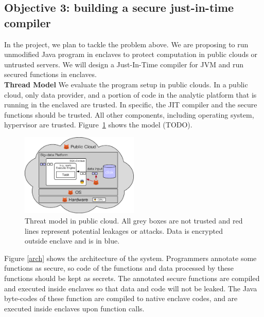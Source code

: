 \vspace{-.15in}\subsection{Objective 3: building a 
secure just-in-time compiler}\label{sec:obj3}\vspace{-.075in}


In the project, we plan to tackle the problem above. We are proposing to
run unmodified Java program in enclaves to protect computation in public
clouds or untrusted servers. We will design a Just-In-Time compiler for JVM
and run secured functions in enclaves.\\
\textbf{Thread Model} We evaluate the program setup in public clouds.
In a public cloud, only data provider, and a portion of code
in the analytic platform
that is running in the enclaved are trusted. In specific, the JIT compiler and
the secure functions should be trusted.
All other components, including operating system,
hypervisor are trusted. Figure~\ref{fig:threat_public} shows the model (TODO).
\begin{figure}[!h]
  \center
  \footnotesize
  \includegraphics[width=0.5\textwidth]{figures/threat_public.ps}
  \caption{\footnotesize{Threat model in public cloud. All grey boxes are not 
trusted and red lines
  represent potential leakages or attacks. Data is encrypted outside enclave and 
is in blue.}}
  \label{fig:threat_public}
\end{figure}

Figure \ref{arch} shows the architecture
of the system. Programmers annotate some functions as secure, so code of the 
functions
and data processed by these functions should be kept as secrets.
The annotated secure functions are compiled and executed inside
enclaves so that data and code will not be leaked.
The Java byte-codes of these function are compiled to native enclave
codes, and are executed inside enclaves upon function calls.

